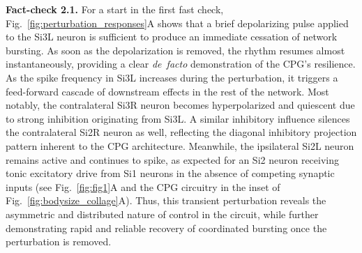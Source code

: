 \documentclass[nofootinbib,aip,amsmath,amssymb,reprint,twocolumn,10pt]{revtex4-2}
\begin{document}
{\bf Fact-check 2.1.}
For a start in the first fast check, Fig.~\ref{fig:perturbation_responses}A shows that a brief depolarizing pulse applied to the Si3L neuron is sufficient to produce an immediate cessation of network bursting. As soon as the depolarization is removed, the rhythm resumes almost instantaneously, providing a clear {\em de~facto} demonstration of the CPG's resilience. As the spike frequency in Si3L increases during the perturbation, it triggers a feed-forward cascade of downstream effects in the rest of the network. Most notably, the contralateral Si3R neuron becomes hyperpolarized and quiescent due to strong inhibition originating from Si3L. A similar inhibitory influence silences the contralateral Si2R neuron as well, reflecting the diagonal inhibitory projection pattern inherent to the CPG architecture. Meanwhile, the ipsilateral Si2L neuron remains active and continues to spike, as expected for an Si2 neuron receiving tonic excitatory drive from Si1 neurons in the absence of competing synaptic inputs (see Fig.~\ref{fig:fig1}A and the CPG circuitry in the inset of Fig.~\ref{fig:bodysize_collage}A). Thus, this transient perturbation reveals the asymmetric and distributed nature of control in the circuit, while further demonstrating rapid and reliable recovery of coordinated bursting once the perturbation is removed.      
\end{document}
